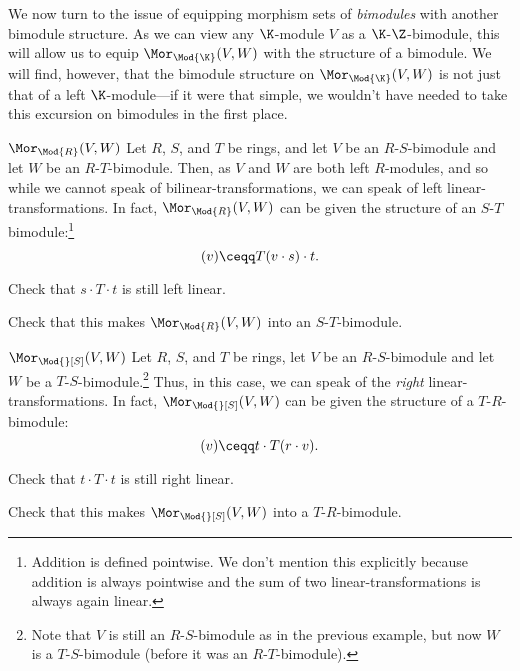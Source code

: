 We now turn to the issue of equipping morphism sets of \emph{bimodules} with another bimodule structure.  As we can view any $\K$-module $V$ as a $\K$-$\Z$-bimodule, this will allow us to equip $\Mor _{\Mod{\K}}(V,W)$ with the structure of a bimodule.  We will find, however, that the bimodule structure on $\Mor _{\Mod{\K}}(V,W)$ is not just that of a left $\K$-module---if it were that simple, we wouldn't have needed to take this excursion on bimodules in the first place.
\begin{exm}{$\Mor _{\Mod{R}}(V,W)$}{}
	Let $R$, $S$, and $T$ be rings, and let $V$ be an $R$-$S$-bimodule and let $W$ be an $R$-$T$-bimodule.  Then, as $V$ and $W$ are both left $R$-modules, and so while we cannot speak of bilinear-transformations, we can speak of left linear-transformations.  In fact, $\Mor _{\Mod{R}}(V,W)$ can be given the structure of an $S$-$T$ bimodule:\footnote{Addition is defined pointwise.  We don't mention this explicitly because addition is always pointwise and the sum of two linear-transformations is always again linear.}
	\begin{equation}
		[s\cdot T\cdot t](v)\ceqq T(v\cdot s)\cdot t.
	\end{equation}
	\begin{exr}[breakable=false]{}{}
		Check that $s\cdot T\cdot t$ is still left linear.
	\end{exr}
	\begin{exr}[breakable=false]{}{}
		Check that this makes $\Mor _{\Mod{R}}(V,W)$ into an $S$-$T$-bimodule.
	\end{exr}
\end{exm}
\begin{exm}{$\Mor _{\Mod{}[S]}(V,W)$}{}
	Let $R$, $S$, and $T$ be rings, let $V$ be an $R$-$S$-bimodule and let $W$ be a $T$-$S$-bimodule.\footnote{Note that $V$ is still an $R$-$S$-bimodule as in the previous example, but now $W$ is a $T$-$S$-bimodule (before it was an $R$-$T$-bimodule).}  Thus, in this case, we can speak of the \emph{right} linear-transformations.  In fact, $\Mor _{\Mod{}[S]}(V,W)$ can be given the structure of a $T$-$R$-bimodule:
	\begin{equation}
		[t\cdot T\cdot r](v)\ceqq t\cdot T(r\cdot v).
	\end{equation}
	\begin{exr}[breakable=false]{}{}
		Check that $t\cdot T\cdot t$ is still right linear.
	\end{exr}
	\begin{exr}[breakable=false]{}{}
		Check that this makes $\Mor _{\Mod{}[S]}(V,W)$ into a $T$-$R$-bimodule.
	\end{exr}
\end{exm}
